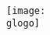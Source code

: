 \newcommand \lersteSeite {
		\gorga \\
		{\fontsize {\gsgL}{\dls} \selectfont \gorgb} \\
		\gorgc \\	
		\texttt{[image: \\glogo]}
		{\fontsize {\gsgL}{\dls} \selectfont \gsempro} \\
		\gsem \\
		\gcsem\\
}

%


%



\neueSeite
	{\ohneKopzeile}
	{\zentriert}
	{\ohneTitel}
	{\lersteSeite}
	
\neueSeite
	{\mitKopfzeile}
	{\linksbuending}
	{\gzweiteSeiteTitel}
	{\gzweiteSeite}
	
	
\neueSeite
	{\mitKopfzeile}
	{\linksbuending}
	{\gdritteSeiteTitel}
	{\gdritteSeite}
		
\neueSeite
	{\mitKopfzeile}
	{\linksbuending}
	{\gvierteSeiteTitel}
	{\gvierteSeite}
	
%
%
%
%
